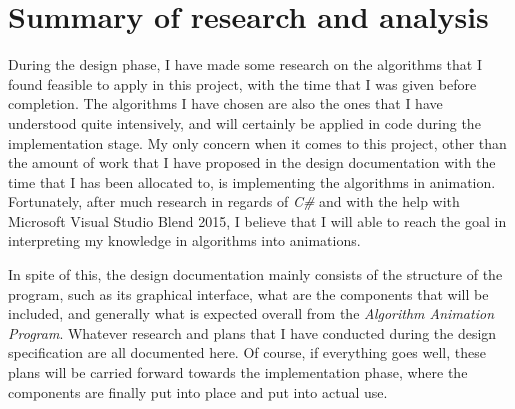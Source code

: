\section{Summary of research and analysis}

During the design phase, I have made some research on the algorithms that I found feasible to apply in this project, with the time that I was given before completion. The algorithms I have chosen are also the ones that I have understood quite intensively, and will certainly be applied in code during the implementation stage. My only concern when it comes to this project, other than the amount of work that I have proposed in the design documentation with the time that I has been allocated to, is implementing the algorithms in animation. Fortunately, after much research in regards of \textit{C\#} and with the help with Microsoft Visual Studio Blend 2015, I believe that I will able to reach the goal in interpreting my knowledge in algorithms into animations.

In spite of this, the design documentation mainly consists of the structure of the program, such as its graphical interface, what are the components that will be included, and generally what is expected overall from the \textit{Algorithm Animation Program}. Whatever research and plans that I have conducted during the design specification are all documented here. Of course, if everything goes well, these plans will be carried forward towards the implementation phase, where the components are finally put into place and put into actual use. 
